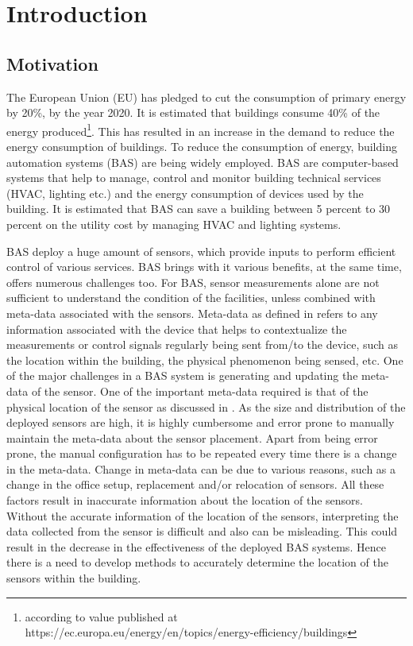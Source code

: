 \chapter{Introduction}
\label{chp:introduction}
\section{Motivation}
The European Union (EU) has pledged to cut the consumption of primary energy by 20\%, by the year 2020.  It is estimated that buildings consume 40\% of the energy produced\footnote{according to value published at https://ec.europa.eu/energy/en/topics/energy-efficiency/buildings }.  This has resulted in an increase in the demand to reduce the energy consumption of buildings. To reduce the consumption of energy, building automation systems (BAS) are being widely employed. BAS are computer-based systems that help to manage, control and monitor building technical services (HVAC, lighting etc.) and the energy consumption of devices used by the building. It is estimated that BAS can save a building between 5 percent to 30 percent on the utility cost by managing HVAC and lighting systems\cite{bas}.

BAS deploy a huge amount of sensors, which provide inputs to perform efficient control of various services. BAS brings with it various benefits, at the same time, offers numerous challenges too. For BAS, sensor measurements alone are not sufficient to understand the condition of the facilities, unless combined with meta-data associated with the sensors.
Meta-data as defined in \cite{gao2015data} refers to any information associated  with the device that helps to contextualize the measurements or control signals regularly being sent from/to the device, such as the location within the building, the physical phenomenon being sensed, etc. One of the major challenges in a BAS system is generating and updating the meta-data of the sensor.
One of the important meta-data required is that of the physical location of the sensor as discussed in  \cite{liu2009requirements}.
As the size and distribution of the deployed sensors are high, it is highly cumbersome and error prone to manually maintain the meta-data about the sensor placement. Apart from being error prone, the manual configuration has to be repeated every time there is a change in the meta-data. Change in meta-data can be due to various reasons, such as a change in the office setup, replacement and/or relocation of sensors. All these factors result in inaccurate information about the location of the sensors. Without the accurate information of the location of the sensors, interpreting the data collected from the sensor is difficult and also can be misleading. This could result in the decrease in the effectiveness of the deployed BAS systems. Hence there is a need to develop methods to accurately determine the location of the sensors within the building.
